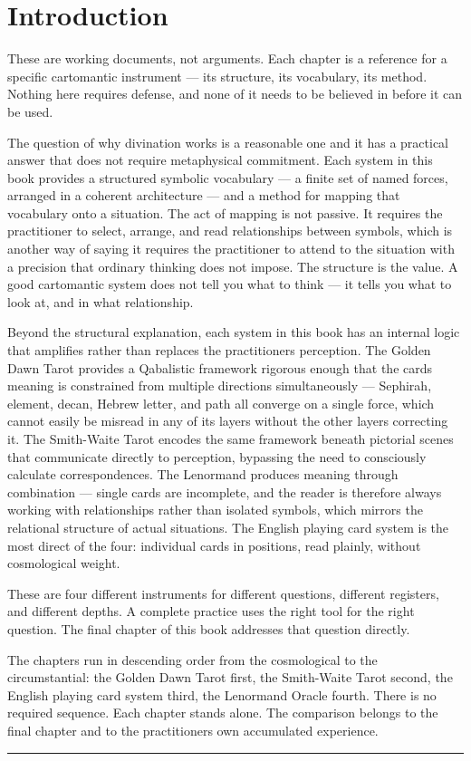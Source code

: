 \section{Introduction}\label{introduction}

These are working documents, not arguments. Each chapter is a reference for a specific cartomantic instrument --- its structure, its vocabulary, its method. Nothing here requires defense, and none of it needs to be believed in before it can be used.

The question of why divination works is a reasonable one and it has a practical answer that does not require metaphysical commitment. Each system in this book provides a structured symbolic vocabulary --- a finite set of named forces, arranged in a coherent architecture --- and a method for mapping that vocabulary onto a situation. The act of mapping is not passive. It requires the practitioner to select, arrange, and read relationships between symbols, which is another way of saying it requires the practitioner to attend to the situation with a precision that ordinary thinking does not impose. The structure is the value. A good cartomantic system does not tell you what to think --- it tells you what to look at, and in what relationship.

Beyond the structural explanation, each system in this book has an internal logic that amplifies rather than replaces the practitioner\textquotesingle s perception. The Golden Dawn Tarot provides a Qabalistic framework rigorous enough that the card\textquotesingle s meaning is constrained from multiple directions simultaneously --- Sephirah, element, decan, Hebrew letter, and path all converge on a single force, which cannot easily be misread in any of its layers without the other layers correcting it. The Smith-Waite Tarot encodes the same framework beneath pictorial scenes that communicate directly to perception, bypassing the need to consciously calculate correspondences. The Lenormand produces meaning through combination --- single cards are incomplete, and the reader is therefore always working with relationships rather than isolated symbols, which mirrors the relational structure of actual situations. The English playing card system is the most direct of the four: individual cards in positions, read plainly, without cosmological weight.

These are four different instruments for different questions, different registers, and different depths. A complete practice uses the right tool for the right question. The final chapter of this book addresses that question directly.

The chapters run in descending order from the cosmological to the circumstantial: the Golden Dawn Tarot first, the Smith-Waite Tarot second, the English playing card system third, the Lenormand Oracle fourth. There is no required sequence. Each chapter stands alone. The comparison belongs to the final chapter and to the practitioner\textquotesingle s own accumulated experience.

\begin{center}\rule{0.5\linewidth}{0.5pt}\end{center}
